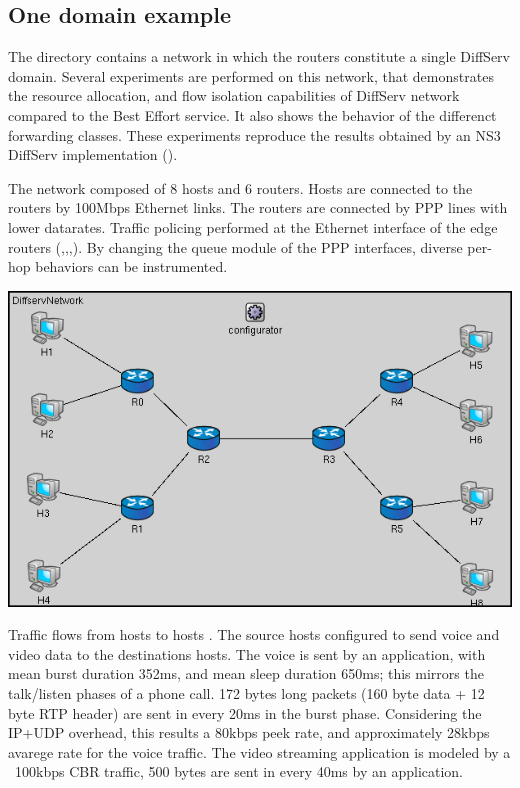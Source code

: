 \subsection{One domain example}

The  directory contains
a network in which the routers constitute a single DiffServ domain.
Several experiments are performed on this network, that demonstrates
the resource allocation, and flow isolation capabilities of DiffServ
network compared to the Best Effort service. It also shows the
behavior of the differenct forwarding classes. These experiments
reproduce the results obtained by an NS3 DiffServ implementation
(\cite{Sanjay2010}).

The network composed of 8 hosts and 6 routers.
Hosts are connected to the routers by 100Mbps Ethernet links. The
routers are connected by PPP lines with lower datarates.
Traffic policing performed at the Ethernet interface of the edge
routers (,,,). By changing
the queue module of the PPP interfaces, diverse per-hop behaviors
can be instrumented.

\begin{center}
\includegraphics[scale=0.5]{figures/OneDomainDiffservNetwork.png}
\end{center}

Traffic flows from hosts  to hosts . The source hosts
configured to send voice and video data to the destinations hosts. The voice
is sent by an  application, with mean burst duration
352ms, and mean sleep duration 650ms; this mirrors the talk/listen phases
of a phone call. 172 bytes long packets (160 byte data + 12 byte RTP header)
are sent in every 20ms in the burst phase. Considering the IP+UDP overhead,
this results a 80kbps peek rate, and approximately 28kbps avarege rate for
the voice traffic. The video streaming application is modeled by a ~100kbps
CBR traffic, 500 bytes are sent in every 40ms by an 
application.

